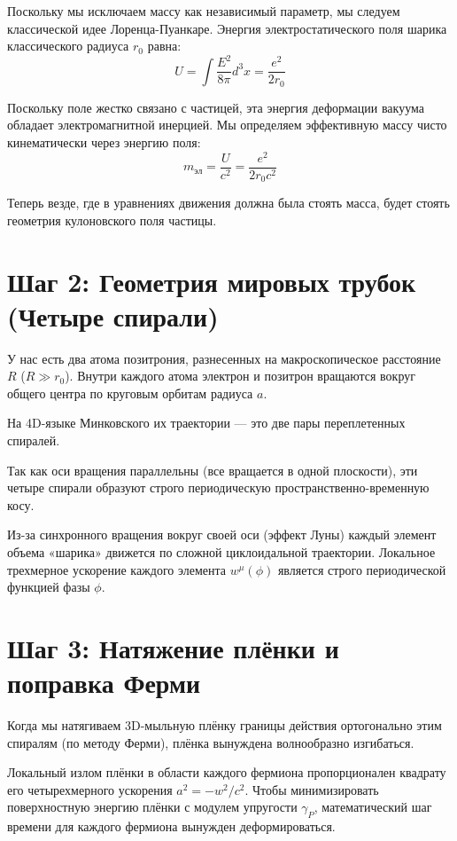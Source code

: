 \documentclass[12pt,a4paper]{article}
\begin{document}
Поскольку мы исключаем массу как независимый параметр, мы следуем классической идее Лоренца-Пуанкаре. Энергия электростатического поля шарика классического радиуса $r_0$ равна:
\begin{equation}
U = \int \frac{E^2}{8\pi} d^3x = \frac{e^2}{2r_0}
\end{equation}

Поскольку поле жестко связано с частицей, эта энергия деформации вакуума обладает электромагнитной инерцией. Мы определяем эффективную массу чисто кинематически через энергию поля:
\begin{equation}
m_{эл} = \frac{U}{c^2} = \frac{e^2}{2r_0 c^2}
\end{equation}

Теперь везде, где в уравнениях движения должна была стоять масса, будет стоять геометрия кулоновского поля частицы.

\section*{Шаг 2: Геометрия мировых трубок (Четыре спирали)}

У нас есть два атома позитрония, разнесенных на макроскопическое расстояние $R$ ($R \gg r_0$). Внутри каждого атома электрон и позитрон вращаются вокруг общего центра по круговым орбитам радиуса $a$.

На 4D-языке Минковского их траектории — это две пары переплетенных спиралей.

Так как оси вращения параллельны (все вращается в одной плоскости), эти четыре спирали образуют строго периодическую пространственно-временную косу.

Из-за синхронного вращения вокруг своей оси (эффект Луны) каждый элемент объема «шарика» движется по сложной циклоидальной траектории. Локальное трехмерное ускорение каждого элемента $w^\mu(\phi)$ является строго периодической функцией фазы $\phi$.

\section*{Шаг 3: Натяжение плёнки и поправка Ферми}

Когда мы натягиваем 3D-мыльную плёнку границы действия ортогонально этим спиралям (по методу Ферми), плёнка вынуждена волнообразно изгибаться.

Локальный излом плёнки в области каждого фермиона пропорционален квадрату его четырехмерного ускорения $a^2 = -w^2/c^2$. Чтобы минимизировать поверхностную энергию плёнки с модулем упругости $\gamma_P$, математический шаг времени для каждого фермиона вынужден деформироваться.
\end{document}

